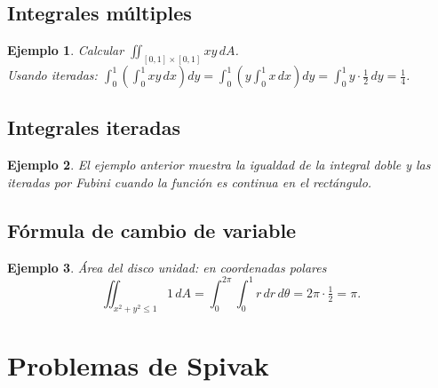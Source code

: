 \documentclass[12pt]{article}
\newtheorem{example}{Ejemplo}[section]
\begin{document}
\subsection{Integrales múltiples}
\begin{example}
Calcular $\displaystyle\iint_{[0,1]\times[0,1]}xy\,dA$.\\
Usando iteradas: $\int_0^1\left(\int_0^1 xy\,dx\right)dy=\int_0^1\left(y\int_0^1 x\,dx\right)dy=\int_0^1 y\cdot\tfrac12\,dy=\tfrac14$.
\end{example}

\subsection{Integrales iteradas}
\begin{example}
El ejemplo anterior muestra la igualdad de la integral doble y las iteradas por Fubini cuando la función es continua en el rectángulo.
\end{example}

\subsection{Fórmula de cambio de variable}
\begin{example}
Área del disco unidad: en coordenadas polares
$$\iint_{x^2+y^2\le1}1\,dA=\int_{0}^{2\pi}\int_{0}^{1}r\,dr\,d\theta=2\pi\cdot\tfrac{1}{2}=\pi.$$
\end{example}

\section{Problemas de Spivak}


\newpage
\appendix


\newpage


\newpage


\newpage


\newpage


\newpage


\newpage


\newpage


\newpage


\newpage

\end{document}

